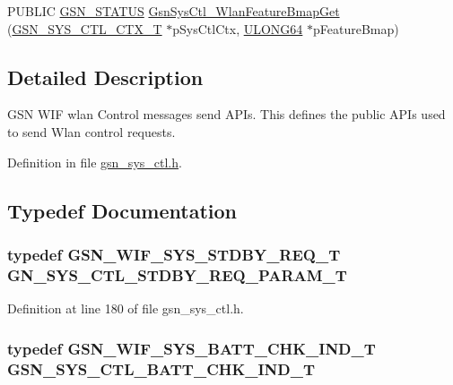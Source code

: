 \begin{DoxyCompactItemize}
\item 
PUBLIC \hyperlink{a00660_gada5951904ac6110b1fa95e51a9ddc217}{GSN\_\-STATUS} \hyperlink{a00592_a65574d21f7d6480cc1f53b36d10e39e8}{GsnSysCtl\_\-WlanFeatureBmapGet} (\hyperlink{a00248}{GSN\_\-SYS\_\-CTL\_\-CTX\_\-T} $\ast$pSysCtlCtx, \hyperlink{a00660_ga28961430434ccabca6862ea93fe9a15b}{ULONG64} $\ast$pFeatureBmap)
\end{DoxyCompactItemize}


\subsection{Detailed Description}
GSN WIF wlan Control messages send APIs. This defines the public APIs used to send Wlan control requests. 

Definition in file \hyperlink{a00592_source}{gsn\_\-sys\_\-ctl.h}.



\subsection{Typedef Documentation}
\hypertarget{a00592_a2541026eb876a1b97821d653e78471e8}{
\subsubsection[{GN\_\-SYS\_\-CTL\_\-STDBY\_\-REQ\_\-PARAM\_\-T}]{\setlength{\rightskip}{0pt plus 5cm}typedef {\bf GSN\_\-WIF\_\-SYS\_\-STDBY\_\-REQ\_\-T} {\bf GN\_\-SYS\_\-CTL\_\-STDBY\_\-REQ\_\-PARAM\_\-T}}}
\label{a00592_a2541026eb876a1b97821d653e78471e8}


Definition at line 180 of file gsn\_\-sys\_\-ctl.h.

\hypertarget{a00592_a641249d44e4f0127d70dd3bdd2d03ef7}{
\subsubsection[{GSN\_\-SYS\_\-CTL\_\-BATT\_\-CHK\_\-IND\_\-T}]{\setlength{\rightskip}{0pt plus 5cm}typedef {\bf GSN\_\-WIF\_\-SYS\_\-BATT\_\-CHK\_\-IND\_\-T} {\bf GSN\_\-SYS\_\-CTL\_\-BATT\_\-CHK\_\-IND\_\-T}}}
\label{a00592_a641249d44e4f0127d70dd3bdd2d03ef7}


